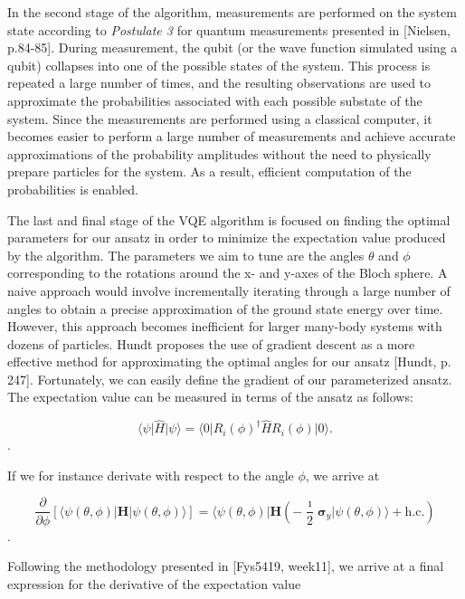 \documentclass[onecolumn,10pt,cleanfoot]{asme2ej}
\begin{document}
In the second stage of the algorithm, measurements are performed on the system state according to \textit{Postulate 3} for quantum measurements presented in [Nielsen, p.84-85]. During measurement, the qubit (or the wave function simulated using a qubit) collapses into one of the possible states of the system. This process is repeated a large number of times, and the resulting observations are used to approximate the probabilities associated with each possible substate of the system. Since the measurements are performed using a classical computer, it becomes easier to perform a large number of measurements and achieve accurate approximations of the probability amplitudes without the need to physically prepare particles for the system. As a result, efficient computation of the probabilities is enabled. 

The last and final stage of the VQE algorithm is focused on finding the optimal parameters for our ansatz in order to minimize the expectation value produced by the algorithm. The parameters we aim to tune are the angles $\theta$ and $\phi$ corresponding to the rotations around the x- and y-axes of the Bloch sphere. A naive approach would involve incrementally iterating through a large number of angles to obtain a precise approximation of the ground state energy over time. However, this approach becomes inefficient for larger many-body systems with dozens of particles. Hundt proposes the use of gradient descent as a more effective method for approximating the optimal angles for our ansatz [Hundt, p. 247]. Fortunately, we can easily define the gradient of our parameterized ansatz. The expectation value can be measured in terms of the ansatz as follows:


\begin{equation}
\langle \psi \vert \hat{H} \vert \psi \rangle = \langle 0 \vert R_i(\phi)^{\dagger} \hat{H} R_i(\phi) \vert 0 \rangle.
\end{equation}. 

If we for instance derivate with respect to the angle $\phi$, we arrive at 

\begin{equation}
\frac{\partial}{\partial \phi} \left[\langle \psi(\theta,\phi) \vert \boldsymbol{H} \vert \psi(\theta,\phi) \rangle\right] = \langle \psi(\theta,\phi) \vert \boldsymbol{H} \left(-\frac{\imath}{2} \boldsymbol{\sigma}_y \vert \psi(\theta,\phi) \rangle + \mathrm{h.c.}\right)
\end{equation}. 

Following the methodology presented in [Fys5419, week11], we arrive at a final expression for the derivative of the expectation value
\end{document}
